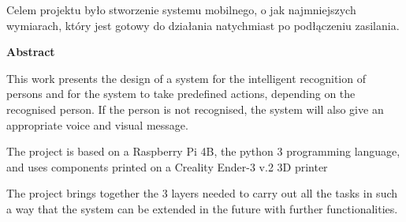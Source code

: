 \documentclass[a4paper,12pt,reqno]{article}
\begin{document}
Celem projektu było stworzenie systemu mobilnego, o jak najmniejszych wymiarach, który jest gotowy do działania natychmiast po podłączeniu zasilania.

%
%
\newpage
\begin{flushleft}
\Large \textbf{Abstract}
\end{flushleft}
\vspace{1cm}

This work presents the design of a system for the intelligent recognition of persons and for the system to take predefined actions, depending on the recognised person. If the person is not recognised, the system will also give an appropriate voice and visual message.

The project is based on a Raspberry Pi 4B, the python 3 programming language, and uses components printed on a Creality Ender-3 v.2 3D printer

The project brings together the 3 layers needed to carry out all the tasks in such a way that the system can be extended in the future with further functionalities.
\end{document}

